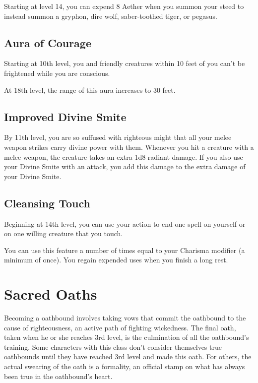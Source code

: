 Starting at level 14, you can expend 8 Aether when you summon your steed to instead summon a gryphon, dire wolf, saber-toothed tiger, or pegasus.

\subsection{Aura of Courage}

Starting at 10th level, you and friendly creatures within 10 feet of you can't be frightened while you are conscious.

At 18th level, the range of this aura increases to 30 feet.

\subsection{Improved Divine Smite}

By 11th level, you are so suffused with righteous might that all your melee weapon strikes carry divine power with them. Whenever you hit a creature with a melee weapon, the creature takes an extra 1d8 radiant damage. If you also use your Divine Smite with an attack, you add this damage to the extra damage of your Divine Smite.

\subsection{Cleansing Touch}

Beginning at 14th level, you can use your action to end one spell on yourself or on one willing creature that you touch.

You can use this feature a number of times equal to your Charisma modifier (a minimum of once). You regain expended uses when you finish a long rest.

\section{Sacred Oaths}

Becoming a oathbound involves taking vows that commit the oathbound to the cause of righteousness, an active path of fighting wickedness. The final oath, taken when he or she reaches 3rd level, is the culmination of all the oathbound's training. Some characters with this class don't consider themselves true oathbounds until they have reached 3rd level and made this oath. For others, the actual swearing of the oath is a formality, an official stamp on what has always been true in the oathbound's heart.

